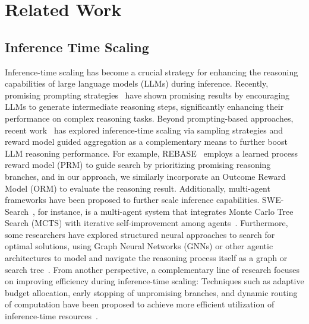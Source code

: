 \documentclass[11pt]{article}
\theoremstyle{definition}
\theoremstyle{remark}
\begin{document}
\clearpage
\twocolumn
\nolinenumbers
\section{Related Work}
\subsection{Inference Time Scaling}

Inference-time scaling has become a crucial strategy for enhancing the reasoning capabilities of large language models (LLMs) during inference. Recently, promising prompting strategies~\citep{wei2022chain, yao2023tree} have shown promising results by encouraging LLMs to generate intermediate reasoning steps, significantly enhancing their performance on complex reasoning tasks. Beyond prompting-based approaches, recent work~\citep{lightman2024lets, brown2024largelanguagemonkeysscaling, snell2025scaling, wu2025inference, light2025disc, liu-etal-2025-rethinking} has explored inference-time scaling via sampling strategies and reward model guided aggregation as a complementary means to further boost LLM reasoning performance. For example, REBASE~\citep{wu2025inference} employs a learned process reward model (PRM) to guide search by prioritizing promising reasoning branches, and in our approach, we similarly incorporate an Outcome Reward Model (ORM) to evaluate the reasoning result. Additionally, multi-agent frameworks have been proposed to further scale inference capabilities. SWE-Search~\citep{antoniades2025swesearch}, for instance, is a multi-agent system that integrates Monte Carlo Tree Search (MCTS) with iterative self-improvement among agents~\citep{zhang2025aflow, jin2025two, light2025strategist}. Furthermore, some researchers have explored structured neural approaches to search for optimal solutions, using Graph Neural Networks (GNNs) or other agentic architectures to model and navigate the reasoning process itself as a graph or search tree~\citep{zhangg, zhang2025aflow, zhangcut}. From another perspective, a complementary line of research focuses on improving efficiency during inference-time scaling: Techniques such as adaptive budget allocation, early stopping of unpromising branches, and dynamic routing of computation have been proposed to achieve more efficient utilization of inference-time resources~\citep{misaki2025wider, xu-etal-2025-ph, li2024escape, light2025sfs}.
\end{document}
